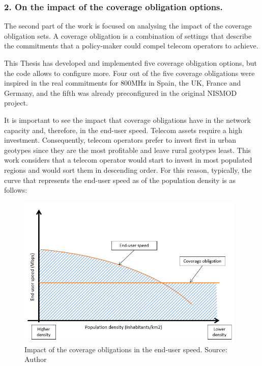 \subsubsection*{2. On the impact of the coverage obligation options.}
The second part of the work is focused on analysing the impact of the coverage obligation sets. A coverage obligation is a combination of settings that describe the commitments that a policy-maker could compel telecom operators to achieve.\par

This Thesis has developed and implemented five coverage obligation options, but the code allows to configure more. Four out of the five coverage obligations were inspired in the real commitments for 800MHz in Spain, the UK, France and Germany, and the fifth was already preconfigured in the original NISMOD project. \par

It is important to see the impact that coverage obligations have in the network capacity and, therefore, in the end-user speed. Telecom assets require a high investment. Consequently, telecom operators prefer to invest first in urban geotypes since they are the most profitable and leave rural geotypes least. This work considers that a telecom operator would start to invest in most populated regions and would sort them in descending order. For this reason, typically, the curve that represents the end-user speed as of the population density is as follows:\par



\begin{figure}[H]
	\begin{Center}
		\includegraphics[width=4.29in,height=2.86in]{./media/image103.png}
		\caption{Impact of the coverage obligations in the end-user speed. Source: Author}
	\end{Center}
\end{figure}


